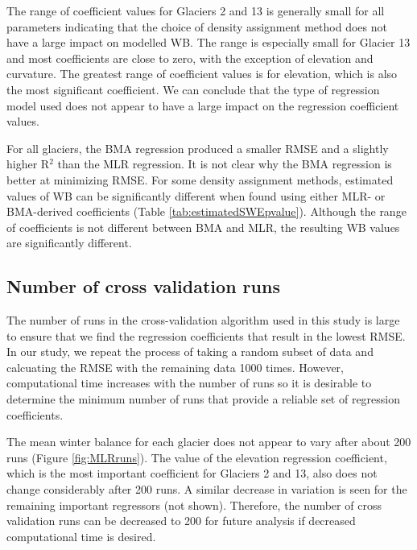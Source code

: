 \documentclass{sfuthesis}
\begin{document}
The range of coefficient values for Glaciers 2 and 13 is generally small for all parameters indicating that the choice of density assignment method does not have a large impact on modelled WB. The range is especially small for Glacier 13 and most coefficients are close to zero, with the exception of elevation and curvature. The greatest range of coefficient values is for elevation, which is also the most significant coefficient. We can conclude that the type of regression model used does not appear to have a large impact on the regression coefficient values.

For all glaciers, the BMA regression produced a smaller RMSE and a slightly higher R$^2$ than the MLR regression. It is not clear why the BMA regression is better at minimizing RMSE. For some density assignment methods, estimated values of WB can be significantly different when found using either MLR- or BMA-derived coefficients (Table \ref{tab:estimatedSWEpvalue}). Although the range of coefficients is not different between BMA and MLR, the resulting WB values are significantly different. 

\subsection{Number of cross validation runs}

The number of runs in the cross-validation algorithm used in this study is large to ensure that we find the regression coefficients that result in the lowest RMSE. In our study, we repeat the process of taking a random subset of data and calcuating the RMSE with the remaining data 1000 times.  However, computational time increases with the number of runs so it is desirable to determine the minimum number of runs that provide a reliable set of regression coefficients. 

The mean winter balance for each glacier does not appear to vary after about 200 runs (Figure \ref{fig:MLRruns}). The value of the elevation regression coefficient, which is the most important coefficient for Glaciers 2 and 13, also does not change considerably after 200 runs. A similar decrease in variation is seen for the remaining important regressors (not shown). Therefore, the number of cross validation runs can be decreased to 200 for future analysis if decreased computational time is desired. 
\end{document}
